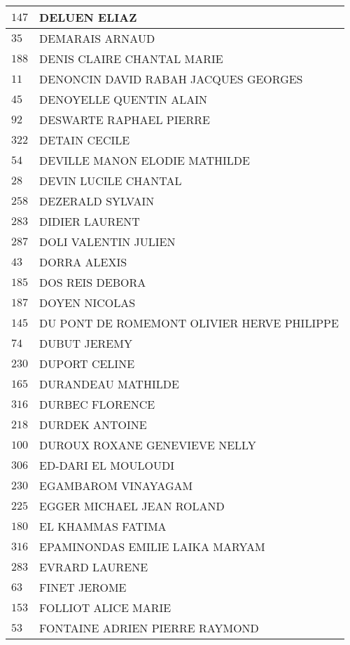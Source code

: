 \begin{xltabular}{\linewidth}{|l|X|}
    \hline
    $147$ & DELUEN ELIAZ \\
    \hline
    $35$ & DEMARAIS ARNAUD \\
    \hline
    $188$ & DENIS CLAIRE CHANTAL MARIE \\
    \hline
    $11$ & DENONCIN DAVID RABAH JACQUES GEORGES \\
    \hline
    $45$ & DENOYELLE QUENTIN ALAIN \\
    \hline
    $92$ & DESWARTE RAPHAEL PIERRE \\
    \hline
    $322$ & DETAIN CECILE \\
    \hline
    $54$ & DEVILLE MANON ELODIE MATHILDE \\
    \hline
    $28$ & DEVIN LUCILE CHANTAL \\
    \hline
    $258$ & DEZERALD SYLVAIN \\
    \hline
    $283$ & DIDIER LAURENT \\
    \hline
    $287$ & DOLI VALENTIN JULIEN \\
    \hline
    $43$ & DORRA ALEXIS \\
    \hline
    $185$ & DOS REIS DEBORA \\
    \hline
    $187$ & DOYEN NICOLAS \\
    \hline
    $145$ & DU PONT DE ROMEMONT OLIVIER HERVE PHILIPPE \\
    \hline
    $74$ & DUBUT JEREMY \\
    \hline
    $230$ & DUPORT CELINE \\
    \hline
    $165$ & DURANDEAU MATHILDE \\
    \hline
    $316$ & DURBEC FLORENCE \\
    \hline
    $218$ & DURDEK ANTOINE \\
    \hline
    $100$ & DUROUX ROXANE GENEVIEVE NELLY \\
    \hline
    $306$ & ED-DARI EL MOULOUDI \\
    \hline
    $230$ & EGAMBAROM VINAYAGAM \\
    \hline
    $225$ & EGGER MICHAEL JEAN ROLAND \\
    \hline
    $180$ & EL KHAMMAS FATIMA \\
    \hline
    $316$ & EPAMINONDAS EMILIE LAIKA MARYAM \\
    \hline
    $283$ & EVRARD LAURENE \\
    \hline
    $63$ & FINET JEROME \\
    \hline
    $153$ & FOLLIOT ALICE MARIE \\
    \hline
    $53$ & FONTAINE ADRIEN PIERRE RAYMOND \\

\end{xltabular}
